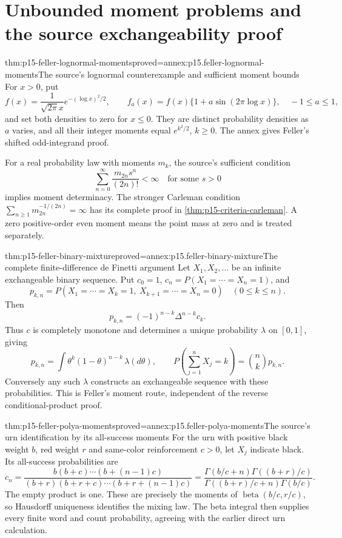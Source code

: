 \section{Unbounded moment problems and the source exchangeability proof}

\begin{hbtheorem}{thm:p15-feller-lognormal-moments}{proved=annex:p15.feller-lognormal-moments}{The source's lognormal counterexample and sufficient moment bounds}
For \(x>0\), put
\[
 f(x)=\frac{1}{\sqrt{2\pi}x}e^{-(\log x)^2/2},\qquad
 f_a(x)=f(x)\{1+a\sin(2\pi\log x)\},\quad -1\leq a\leq1,
\]
and set both densities to zero for \(x\leq0\).
They are distinct probability densities as \(a\) varies, and all
their integer moments equal \(e^{k^2/2}\), \(k\geq0\).
The annex gives Feller's shifted odd-integrand proof.

For a real probability law with moments \(m_k\), the source's sufficient
condition
\[
                 \sum_{n=0}^\infty\frac{m_{2n}s^n}{(2n)!}<\infty
                               \quad\text{for some }s>0
\]
implies moment determinacy. The stronger Carleman condition
\(\sum_{n\geq1}m_{2n}^{-1/(2n)}=\infty\) has its complete proof in
\cref{thm:p15-criteria-carleman}. A zero positive-order even moment
means the point mass at zero and is treated separately.
\end{hbtheorem}

\begin{hbtheorem}{thm:p15-feller-binary-mixture}{proved=annex:p15.feller-binary-mixture}{The complete finite-difference de Finetti argument}
Let \(X_1,X_2,\ldots\) be an infinite exchangeable binary sequence.
Put \(c_0=1\),
\(c_n=P(X_1=\cdots=X_n=1)\), and
\[
 p_{k,n}=P(X_1=\cdots=X_k=1,\ X_{k+1}=\cdots=X_n=0)
                      \quad(0\leq k\leq n).
\]
Then
\[
                         p_{k,n}=(-1)^{n-k}\Delta^{n-k}c_k.
\]
Thus \(c\) is completely monotone and determines a unique probability
\(\lambda\) on \([0,1]\), giving
\[
 p_{k,n}=\int\theta^k(1-\theta)^{n-k}\,\lambda(d\theta),\qquad
 P\!\left(\sum_{j=1}^nX_j=k\right)=\binom nk p_{k,n}.
\]
Conversely any such \(\lambda\) constructs an exchangeable sequence
with these probabilities. This is Feller's moment route, independent
of the reverse conditional-product proof.
\end{hbtheorem}

\begin{hbtheorem}{thm:p15-feller-polya-moments}{proved=annex:p15.feller-polya-moments}{The source's urn identification by its all-success moments}
For the urn with positive black weight \(b\), red weight \(r\)
and same-color reinforcement \(c>0\), let \(X_j\) indicate black.
Its all-success probabilities are
\[
 c_n=\frac{b(b+c)\cdots(b+(n-1)c)}
             {(b+r)(b+r+c)\cdots(b+r+(n-1)c)}
     =\frac{\Gamma(b/c+n)\Gamma((b+r)/c)}
             {\Gamma((b+r)/c+n)\Gamma(b/c)}.
\]
The empty product is one. These are precisely the moments of
\(\operatorname{beta}(b/c,r/c)\), so Hausdorff uniqueness identifies
the mixing law. The beta integral then supplies every finite word
and count probability, agreeing with the earlier direct urn calculation.
\end{hbtheorem}

